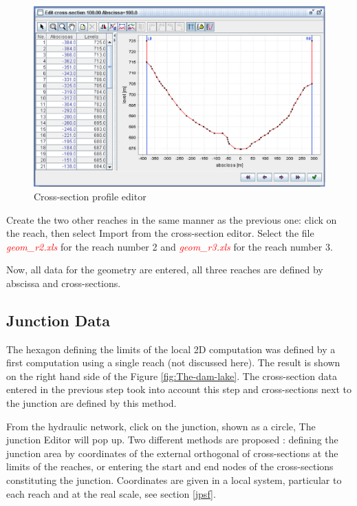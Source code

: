 \documentclass[a4paper,12pt]{article}
\begin{document}
\begin{figure}[h]
  \begin{center}
  \includegraphics[scale=0.5]{cross-section}
  \caption{Cross-section profile editor}
  \label{fig:example-cross-section-junction}
  \end{center}
\end{figure}

Create the two other reaches in the same manner as the previous one: click on the reach, then select
Import from the cross-section editor. Select the file \textcolor{red}{\textit{geom\_r2.xls}}
for the reach number 2 and \textcolor{red}{\textit{geom\_r3.xls}} for the reach
number 3.

\vspace{0.5cm}

Now, all data for the geometry are entered, all three reaches are
defined by abscissa and cross-sections.


\subsection{Junction Data}

\hspace{0.5cm} The hexagon defining the limits of the local 2D computation was defined
by a first computation using a single reach (not discussed here).
The result is shown on the right hand side of the Figure \ref{fig:The-dam-lake}.
The cross-section data entered in the previous step took into
account this step and cross-sections next to the junction are
defined by this method. 

From the hydraulic network, click on the junction, shown as a circle, 
The junction Editor will pop up. Two different methods
are proposed : defining the junction area by coordinates
of the external orthogonal of cross-sections at the
limits of the reaches, or entering the start and end nodes of the
cross-sections constituting the junction. Coordinates are given
in a local system, particular to each reach and at the
real scale, see section \ref{jpsf}.
\end{document}
